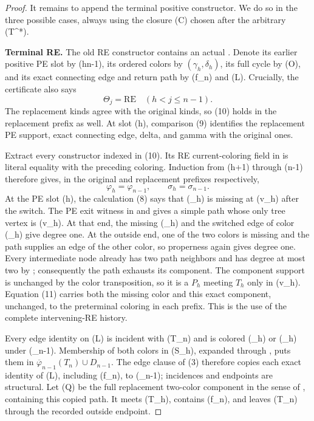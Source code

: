 \begin{proof}
It remains to append the terminal positive constructor.  We do so in the
three possible cases, always using the closure (C) chosen after the
arbitrary (T^*).

\textbf{Terminal RE.}
The old RE constructor contains an actual
.  Denote its earlier positive PE
slot by (h\leq n-1), its ordered colors by
\((\gamma_h,\delta_h)\), its full cycle by (O), and its exact connecting
edge and return path by (f_n) and (L).  Crucially, the certificate also
says
\[
       \Theta_j=\mathrm{RE}\quad(h<j\leq n-1).                 \tag{10}
\]
The replacement kinds agree with the original kinds, so (10) holds in
the replacement prefix as well.  At slot (h), comparison (9) identifies
the replacement PE support, exact connecting edge, delta, and gamma with
the original ones.

Extract every constructor indexed in (10).  Its RE
current-coloring field in  is literal equality
with the preceding coloring.  Induction from (h+1) through (n-1) therefore
gives, in the original and replacement prefixes respectively,
\[
             \varphi_h=\varphi_{n-1},
             \qquad \sigma_h=\sigma_{n-1}.                    \tag{11}
\]
At the PE slot (h), the calculation (8) says that (\delta_h) is missing
at (v_h) after the switch.  The PE exit witness in
 and  gives a simple path whose
only tree vertex is (v_h).  At that end, the missing (\delta_h) and the
switched edge of color (\gamma_h) give degree one.  At the outside end,
one of the two colors is missing and the path supplies an edge of the
other color, so properness again gives degree one.  Every intermediate
node already has two path neighbors and has degree at most two by
; consequently the path exhausts
its component.  The component support is unchanged by the color
transposition, so it is a
 \(P_h\) meeting \(T_h\)
only in (v_h).  Equation (11) carries both the missing color and this exact
component, unchanged, to the preterminal coloring in each prefix.  This
is the use of the complete intervening-RE history.

Every edge identity on (L) is incident with (T_n) and is colored
(\gamma_h) or (\delta_h) under (\varphi_{n-1}).  Membership of both colors
in (S_h), expanded through , puts them in
\(\overline\varphi_{n-1}(T_n)\cup D_{n-1}\).  The edge clause of (3)
therefore copies each exact identity of (L), including (f_n), to
(\sigma_{n-1}); incidences and endpoints are structural.  Let (Q) be the
full replacement two-color component in the sense of
, containing this copied path.  It
meets (T_h), contains (f_n), and leaves (T_n) through the recorded outside
endpoint.


\end{proof}
